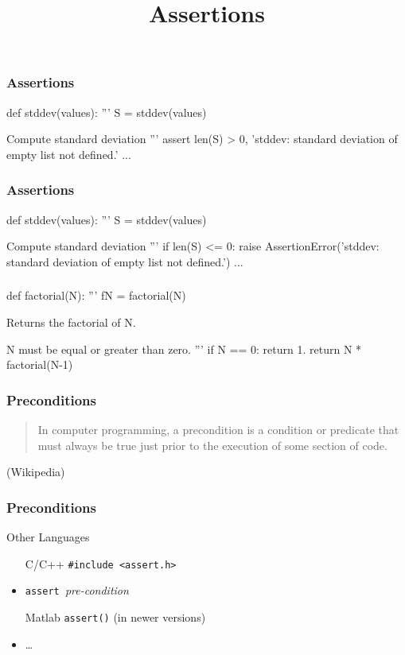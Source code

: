 
\title{Assertions}

\begin{frame}[fragile] %
\frametitle{Assertions}
\begin{python}
def stddev(values):
    '''
    S = stddev(values)

    Compute standard deviation
    '''
    assert len(S) > 0, 'stddev: standard deviation of empty list not defined.'
    ...
\end{python}
\end{frame}

\begin{frame}[fragile] %
\frametitle{Assertions}

\begin{python}
def stddev(values):
    '''
    S = stddev(values)

    Compute standard deviation
    '''
    if len(S) <= 0:
        raise AssertionError('stddev: standard deviation of empty list not defined.')
    ...
\end{python}

\end{frame}

\begin{frame}[fragile] %
\frametitle{}

\begin{python}
def factorial(N):
    '''
    fN = factorial(N)

    Returns the factorial of N.

    N must be equal or greater than zero.
    '''
    if N == 0:
        return 1.
    return N * factorial(N-1)
\end{python}
\end{frame}

\begin{frame}[fragile] %
\frametitle{Preconditions}

\begin{quote}
In computer programming, a precondition is a condition or predicate that must always be true just prior to the execution of some section of code.
\end{quote}

\begin{flushright}
(Wikipedia)
\end{flushright}

\end{frame}

\begin{frame}[fragile] %
\frametitle{Preconditions}
\begin{block}{Other Languages}
\begin{itemize}
\item[C/C++] \lstinline{#include <assert.h>}
\item[Java] \lstinline{assert }\textit{pre-condition}
\item[Matlab] \lstinline{assert()} (in newer versions)
\item[\ldots] \ldots
\end{itemize}
\end{block}
\end{frame}

